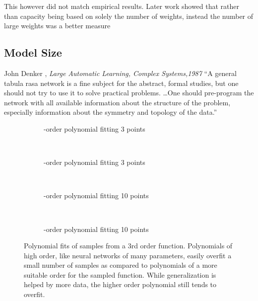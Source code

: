 \documentclass[thesis]{subfiles}
\begin{document}
    This however did not match empirical results. Later work showed that rather than capacity being based on solely the number of weights, instead the number of large weights was a better measure~\citep{bartlett1997}
    
	
    \subsection{Model Size}
	\begin{chapquote}{John Denker \etal, \textit{Large Automatic Learning, Complex Systems,1987}}
		``A general tabula rasa network is a fine subject for the abstract, formal studies, but one should not try to use it to solve practical problems. \ldots One should pre-program the network with all available information about the structure of the problem, especially information about the symmetry and topology of the data.''
	\end{chapquote}
	
	\begin{figure}[tb]
		\centering
		\begin{subfigure}[t]{0.49\textwidth}
			\resizebox{\linewidth}{!}{}
			\caption{-order polynomial fitting 3 points}
			\label{fig:polyfit3rd}
		\end{subfigure}
		~
		\begin{subfigure}[t]{0.49\textwidth}
			\resizebox{\linewidth}{!}{}
			\caption{-order polynomial fitting 3 points}
			\label{fig:polyfit20th}
		\end{subfigure}\\	
		\begin{subfigure}[t]{0.49\textwidth}
			\resizebox{\linewidth}{!}{}
			\caption{-order polynomial fitting 10 points}
			\label{fig:polyfit3rdlots}
		\end{subfigure}
		~
		\begin{subfigure}[t]{0.49\textwidth}
			\resizebox{\linewidth}{!}{}
			\caption{-order polynomial fitting 10 points}
			\label{fig:polyfit20thlots}
		\end{subfigure}
		\caption[Polynomial Data Fitting]{Polynomial fits of samples from a 3rd order function. Polynomials of high order, like neural networks of many parameters, easily overfit a small number of samples as compared to polynomials of a more suitable order for the sampled function. While generalization is helped by more data, the higher order polynomial still tends to overfit.}
		\label{fig:polyfits}
	\end{figure}
\end{document}
